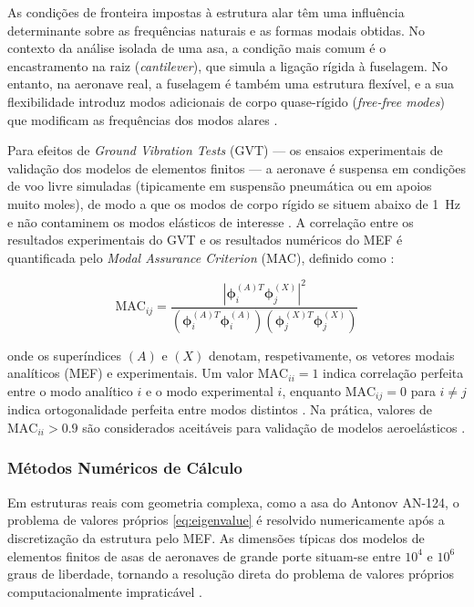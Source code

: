 \documentclass[a4paper,fleqn]{cas-sc}
\begin{document}
As condições de fronteira impostas à estrutura alar têm uma influência determinante sobre as frequências naturais e as formas modais obtidas. No contexto da análise isolada de uma asa, a condição mais comum é o encastramento na raiz (\textit{cantilever}), que simula a ligação rígida à fuselagem. No entanto, na aeronave real, a fuselagem é também uma estrutura flexível, e a sua flexibilidade introduz modos adicionais de corpo quase-rígido (\textit{free-free modes}) que modificam as frequências dos modos alares \cite{Wright2015}.

Para efeitos de \textit{Ground Vibration Tests} (GVT) --- os ensaios experimentais de validação dos modelos de elementos finitos --- a aeronave é suspensa em condições de voo livre simuladas (tipicamente em suspensão pneumática ou em apoios muito moles), de modo a que os modos de corpo rígido se situem abaixo de \SI{1}{\hertz} e não contaminem os modos elásticos de interesse \cite{Ewins2000}. A correlação entre os resultados experimentais do GVT e os resultados numéricos do MEF é quantificada pelo \textit{Modal Assurance Criterion} (MAC), definido como \cite{Allemang1982}:

\begin{equation}
    \text{MAC}_{ij} = \frac{\left| \boldsymbol{\phi}_i^{(A)T} 
    \boldsymbol{\phi}_j^{(X)} \right|^2}
    {\left( \boldsymbol{\phi}_i^{(A)T} \boldsymbol{\phi}_i^{(A)} 
    \right)
    \left( \boldsymbol{\phi}_j^{(X)T} \boldsymbol{\phi}_j^{(X)} 
    \right)}
    \label{eq:mac}
\end{equation}

\noindent onde os superíndices $(A)$ e $(X)$ denotam, respetivamente, os vetores modais analíticos (MEF) e experimentais. Um valor $\text{MAC}_{ii} = 1$ indica correlação perfeita entre o modo analítico $i$ e o modo experimental $i$, enquanto $\text{MAC}_{ij} = 0$ para $i \neq j$ indica ortogonalidade perfeita entre modos distintos \cite{Allemang1982, Ewins2000}. Na prática, valores de $\text{MAC}_{ii} > 0.9$ são considerados aceitáveis para validação de modelos aeroelásticos \cite{EASA2022}.

\subsubsection{Métodos Numéricos de Cálculo}

Em estruturas reais com geometria complexa, como a asa do Antonov AN-124, o problema de valores próprios \eqref{eq:eigenvalue} é resolvido numericamente após a discretização da estrutura pelo MEF. As dimensões típicas dos modelos de elementos finitos de asas de aeronaves de grande porte situam-se entre $10^4$ e $10^6$ graus de liberdade, tornando a resolução direta do problema de valores próprios computacionalmente impraticável \cite{Nastran2014}.
\end{document}
